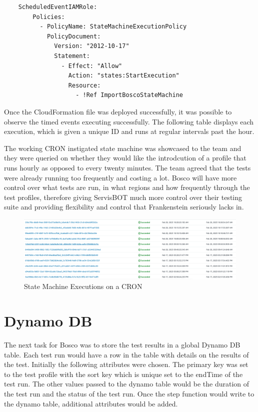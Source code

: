 \documentclass[12pt,a4paper,titlepage]{report}
\begin{document}
\begin{itemize}
 \begin{tcolorbox}
  \begin{verbatim}
    ScheduledEventIAMRole:
        Policies:
          - PolicyName: StateMachineExecutionPolicy
            PolicyDocument:
              Version: "2012-10-17"
              Statement:
                - Effect: "Allow"
                  Action: "states:StartExecution"
                  Resource:
                    - !Ref ImportBoscoStateMachine
  \end{verbatim}
 \end{tcolorbox}
\end{itemize}

Once the  CloudFormation file was deployed successfully, it was possible to observe the timed events executing successfully. The following table displays  
each execution, which is  given a unique ID and runs at regular intervals past the hour. 

The working CRON instigated state machine was showcased to the team and they were 
queried on whether they would like the introdcution of a profile that runs hourly as opposed to every twenty minutes. 
The team agreed that the tests were already running too 
frequently and costing a lot. Bosco will have more control over what tests are run, in what regions and how frequently through the test profiles, therefore giving ServisBOT 
much more control over their testing suite and providing flexibility and control that Frankenstein seriously lacks in.

\begin{figure}[ht]
  \centering
  \includegraphics[width=15cm]{./diagrams/state_machine_cron_executions.png}
  \caption{State Machine Executions on a CRON }
 \end{figure}

\section{Dynamo DB}
The next task for Bosco was to store the test results in a global Dynamo DB table. 
Each test run would have a row in the table with details on the results of the test. 
Initially the following attributes were chosen. The primary key was set to the test profile with the sort key which is unique set to the endTime of the test run. 
The other values passed to the dynamo table would be the duration of the test run and the status of the test run. Once the step function would write to the dynamo table, additional attributes would be added.
\end{document}
